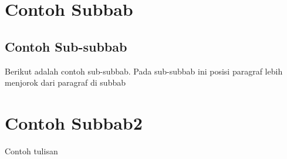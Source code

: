 \section{Contoh Subbab}

\subsection{Contoh Sub-subbab}

Berikut adalah contoh sub-subbab. Pada sub-subbab ini posisi paragraf lebih menjorok dari paragraf di subbab

\section{Contoh Subbab2}

Contoh tulisan